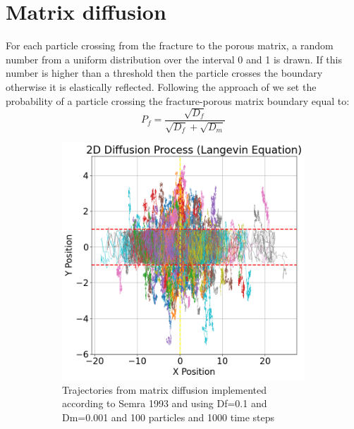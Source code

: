 \documentclass{article}
\begin{document}
\section{Matrix diffusion}
For each particle crossing from the fracture to the porous matrix, a random number from a uniform distribution over the interval 0 and 1 is drawn. If this number is higher than a threshold then the particle crosses the boundary otherwise it is elastically reflected. Following the approach of \cite{salamon2006review} we set the probability of a particle crossing the fracture-porous matrix boundary equal to:
\begin{equation}
    P_f = \frac{\sqrt{D_f}}{\sqrt{D_f}+\sqrt{D_m}}
\end{equation}
\begin{figure}[htbp]
    \centering
    \begin{subfigure}[b]{0.45\textwidth}
        \centering
        \includegraphics[width=\textwidth]{images/trajectoriesMatrixDiffusion.png}
        \caption{Trajectories from matrix diffusion implemented according to Semra 1993 and using Df=0.1 and Dm=0.001 and 100 particles and 1000 time steps}
        \label{fig:MatDiff}
    \end{subfigure}
    \hfill
    \begin{subfigure}[b]{0.45\textwidth}
        \centering

\end{subfigure}
\end{figure}
\end{document}
